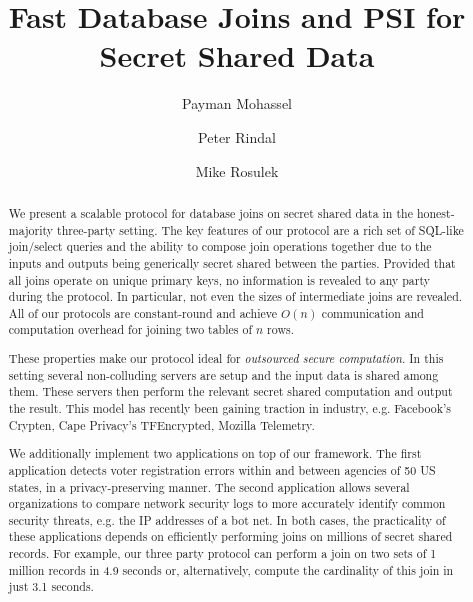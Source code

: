 \documentclass[sigconf]{acmart}
\begin{document}
	\fancyhead{}
	
\title{Fast Database Joins and PSI for Secret Shared Data}

\ifccs
\author{Payman Mohassel}

\author{Peter Rindal}

\author{Mike Rosulek}

\else
\maketitle
\fi

\begin{abstract}
We present a scalable protocol for database joins on secret shared data in the honest-majority three-party setting. The key features of our protocol are a rich set of SQL-like join/select queries and the ability to compose join operations together due to the inputs and outputs being generically secret shared between the parties. Provided that all joins operate on unique primary keys, no information is revealed to any party during the protocol. In particular, not even the sizes of intermediate joins are revealed. All of our protocols are constant-round and achieve $O(n)$ communication and computation overhead for joining two tables of $n$ rows. 

These properties make our protocol ideal for \emph{outsourced secure computation}. In this setting several non-colluding servers are setup and the input data is shared among them. These servers then perform the relevant secret shared computation and output the result. This model has recently been gaining traction in industry, e.g. Facebook's Crypten, Cape Privacy's TFEncrypted, Mozilla Telemetry.

We additionally implement two applications on top of our framework. The first application detects voter registration errors within and between agencies of 50 US states, in a privacy-preserving manner. The second application allows several organizations to compare network security logs to more accurately identify common security threats, e.g. the IP addresses of a bot net. In both cases, the practicality of these applications depends on efficiently performing joins on millions of secret shared records. For example, our three party protocol can perform a join on two sets of 1 million records in 4.9 seconds or, alternatively, compute the cardinality of this join in just 3.1 seconds. 
\end{abstract}
\end{document}
